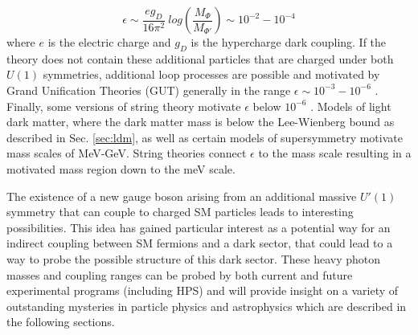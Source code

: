 
\begin{equation}
    \epsilon \sim \frac{e g_D}{16 \pi^2} \ log \left( \frac{M_{\Phi}}{M_{\Phi '}} \right) \sim  10^{-2} - 10^{-4}
    \label{eqn:epsilon}
\end{equation}
where $e$ is the electric charge and $g_D$ is the hypercharge dark coupling. %
If the theory does not contain these additional particles that are charged under both $U(1)$ symmetries, additional loop processes are possible and motivated by Grand Unification Theories (GUT) generally in the range $\epsilon \sim 10^{-3}-10^{-6}$ \cite{ArkaniHamed:2008qp}. Finally, some versions of string theory motivate $\epsilon$ below $10^{-6}$ \cite{Goodsell:2010ie} \cite{Goodsell:2009xc} \cite{Cicoli:2011yh} \cite{Jaeckel_2010}. Models of light dark matter, where the dark matter mass is below the Lee-Wienberg bound as described in Sec. \ref{sec:ldm}, as well as certain models of supersymmetry motivate mass scales of MeV-GeV. String theories connect $\epsilon$ to the mass scale resulting in a motivated mass region down to the meV scale.
 
The existence of a new gauge boson arising from an additional massive $U'(1)$ symmetry that can couple to charged SM particles leads to interesting possibilities. This idea has gained particular interest as a potential way for an indirect coupling between SM fermions and a dark sector, that could lead to a way to probe the possible structure of this dark sector. These heavy photon masses and coupling ranges can be probed by both current and future experimental programs (including HPS) and will provide insight on a variety of outstanding mysteries in particle physics and astrophysics which are described in the following sections.

